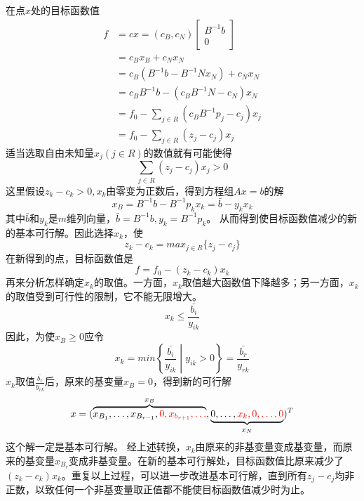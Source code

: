 在点$x$处的目标函数值
\begin{equation}
	\begin{aligned}
	f &= cx = (c_B,c_N) \begin{bmatrix} B^{-1}b \\ 0 \end{bmatrix} \\
	&= c_Bx_B + c_Nx_N \\
	&= c_B(B^{-1}b - B^{-1}Nx_N) + c_Nx_N \\
	&= c_BB^{-1}b - (c_BB^{-1}N - c_N)x_N \\ 
	&= f_0 - \sum_{j\in R}(c_BB^{-1}p_j - c_j)x_j \\
	&= f_0 - \sum_{j\in R}(z_j - c_j)x_j 
	\end{aligned}
\end{equation}
适当选取自由未知量$x_j(j\in R)$的数值就有可能使得
\begin{equation}
	\sum_{j \in R}(z_j - c_j)x_j > 0
\end{equation}
这里假设$z_k - c_k > 0,x_k$由零变为正数后，得到方程组$Ax = b$的解
\begin{equation}
	x_B = B^{-1}b - B^{-1}p_kx_k = \bar{b} - y_kx_k
\end{equation}
其中$\bar{b}$和$y_k$是$m$维列向量，$\bar{b} = B^{-1}b,y_k = B^{-1}p_k$。
从而得到使目标函数值减少的新的基本可行解。因此选择$x_k$，使
\begin{equation}
	z_k - c_k = max_{j\in R}\{ z_j - c_j \}
\end{equation}
在新得到的点，目标函数值是
\begin{equation}
	f = f_0 - (z_k - c_k)x_k
\end{equation}
再来分析怎样确定$x_k$的取值。一方面，$x_k$取值越大函数值下降越多；另一方面，$x_k$的取值受到可行性的限制，它不能无限增大。
\begin{equation}
	x_k \leq \frac{\bar{b_i}}{y_{ik}}
\end{equation}
因此，为使$x_B \geq 0$应令
\begin{equation}
	x_k = min \left\{ \frac{\bar{b_i}}{y_{ik}} \middle | y_{ik} > 0 \right\} = \frac{\bar{b_r}}{y_{rk}}
\end{equation}
$x_k$取值$\frac{\bar{b_r}}{y_{rk}}$后，原来的基变量$x_{B} = 0$，得到新的可行解
\begin{equation}
	x = (\overbrace{x_{B_1}, \dots ,x_{B_{r-1}} ,\color{red}{0},x_{b_{r+1}}, \dots}^{x_B},\underbrace{ 0, \dots, \color{red}{x_k},0,\dots ,0}_{x_N})^T
\end{equation}
这个解一定是基本可行解。
经上述转换，$x_k$由原来的非基变量变成基变量，而原来的基变量$x_{B_r}$变成非基变量。在新的基本可行解处，目标函数值比原来减少了$(z_k - c_k)x_k$。重复以上过程，可以进一步改进基本可行解，直到所有$z_j - c_j$均非正数，以致任何一个非基变量取正值都不能使目标函数值减少时为止。

